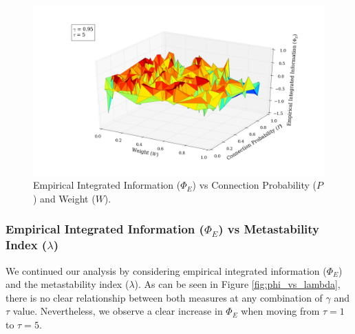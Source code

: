 \documentclass[a4paper,11pt]{article}
\begin{document}
\begin{figure}[H]
\begin{minipage}[b]{0.5\linewidth}
\begin{center}
		\end{center}
		\vspace{4ex}
	\end{minipage}
	\begin{minipage}[b]{0.5\linewidth}
		\begin{center}
		\includegraphics[scale = 0.2]{figures/snn/p_w_phi_95_5}
		\end{center}
		\vspace{4ex}
	\end{minipage}
	\caption{
		Empirical Integrated Information ($\Phi_E$) vs Connection Probability ($P$) and Weight ($W$).
		\label{fig:p_w_phi_1}
	}
\end{figure}

\subsubsection{Empirical Integrated Information ($\Phi_E$) vs Metastability Index ($\lambda$)}
\label{sec:app:snn:res:phi-lambda}
We continued our analysis by considering empirical integrated information ($\Phi_E$) and the metastability index ($\lambda$). As can be seen in Figure \ref{fig:phi_vs_lambda}, there is no clear relationship between both measures at any combination of $\gamma$ and $\tau$ value. Nevertheless, we observe a clear increase in $\Phi_E$ when moving from $\tau = 1$ to $\tau = 5$.
\end{document}
